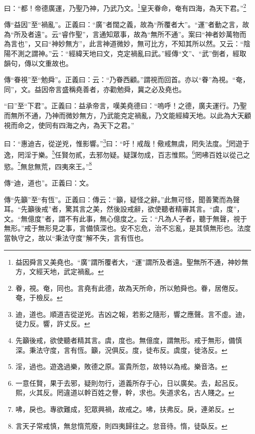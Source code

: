 曰：“都！帝德廣運，乃聖乃神，乃武乃文。\footnote{益因舜言又美堯也。“廣”謂所覆者大，“運”謂所及者遠。聖無所不通，神妙無方，文經天地，武定禍亂。}皇天眷命，奄有四海，為天下君。”\footnote{眷，視。奄，同也。言堯有此德，故為天所命，所以勉舜也。眷，居倦反。奄，于檢反。}

{\noindent\zhuan{}\fzbyks 傳“益因”至“禍亂”。正義曰：“廣”者闊之義，故為“所覆者大”。“運”者動之言，故為“所及者遠”。云“睿作聖”，言通知眾事，故為“無所不通”。案曰“神者妙萬物而為言也”，又曰“神妙無方”，此言神道微妙，無可比方，不知其所以然。又云：“陰陽不測之謂神。”云：“經緯天地曰文，克定禍亂曰武。”經傳“文”、“武”倒者，經取韻句，傳以文重故也。 \par}

{\noindent\zhuan{}\fzbyks 傳“眷視”至“勉舜”。正義曰：云：“乃眷西顧。”謂視而回首。亦以“眷”為視。“奄，同”，文。益因帝言盛稱堯善者，亦勸勉舜，冀之必及堯也。 \par}

{\noindent\shu{}\fzkt “曰”至“下君”。正義曰：益承帝言，嘆美堯德曰：“嗚呼！之德，廣夫運行。乃聖而無所不通，乃神而微妙無方，乃武能克定禍亂，乃文能經緯天地。以此為大天顧視而命之，使同有四海之內，為天下之君。” \par}

曰：“惠迪吉，從逆兇，惟影響。”\footnote{迪，道也。順道吉從逆兇。吉凶之報，若影之隨形，響之應聲。言不虛。迪，徒力反。響，許丈反。}曰：“吁！戒哉！儆戒無虞，罔失法度。\footnote{先籲後戒，欲使聽者精其言。虞，度也。無億度，謂無形。戒于無形，備慎深。秉法守度，言有恆。籲，況俱反。度，徒布反。虞度，徙洛反。}罔遊于逸，罔淫于樂。\footnote{淫，過也。遊逸過樂，敗德之原。富貴所忽，故特以為戒。樂音洛。}任賢勿貳，去邪勿疑。疑謀勿成，百志惟熙。\footnote{一意任賢，果于去邪，疑則勿行，道義所存于心，日以廣矣。去，起呂反。熙，火其反。罔違道以幹百姓之譽，幹，求也。失道求名，古人賤之。}罔咈百姓以從己之慾。\footnote{咈，戾也。專欲難成，犯眾興禍，故戒之。咈，扶弗反。戾，連弟反。}無怠無荒，四夷來王。”\footnote{言天子常戒慎，無怠惰荒廢，則四夷歸往之。怠音待。惰，徒臥反。}

{\noindent\zhuan{}\fzbyks 傳“迪，道也”。正義曰：文。 \par}

{\noindent\zhuan{}\fzbyks 傳“先籲”至“有恆”。正義曰：傳云：“籲，疑怪之辭。”此無可怪，聞善驚而為聲耳。“先籲後戒”者，驚其言之美，然後設戒辭，欲使聽者精審其言。“虞，度”，文。“無億度”者，謂不有此事，無心億度之。云：“凡為人子者，聽于無聲，視于無形。”戒于無形見之事，言備慎深也。安不忘危，治不忘亂，是其慎無形也。法度當執守之，故以“秉法守度”解不失，言有恆也。 \par}


